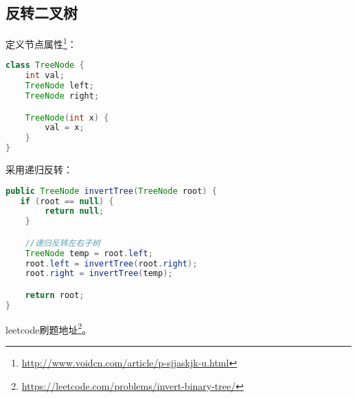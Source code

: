 \documentclass[../../../interview-questions.tex]{subfiles}
\begin{document}
\subsection{反转二叉树}

定义节点属性\footnote{\url{http://www.voidcn.com/article/p-sjjaskjk-u.html}}：

\begin{lstlisting}[language=Java]
class TreeNode {
    int val;
    TreeNode left;
    TreeNode right;

    TreeNode(int x) {
        val = x;
    }
}
\end{lstlisting}

采用递归反转：

\begin{lstlisting}[language=Java]
public TreeNode invertTree(TreeNode root) {
   if (root == null) {
        return null;
    }

    //递归反转左右子树
    TreeNode temp = root.left;
    root.left = invertTree(root.right);
    root.right = invertTree(temp);

    return root; 
}
\end{lstlisting}

leetcode刷题地址\footnote{\url{https://leetcode.com/problems/invert-binary-tree/}}。
\end{document}
